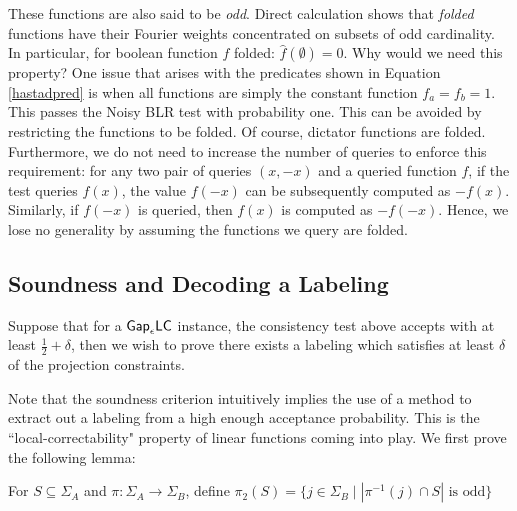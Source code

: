 These functions are also said to be \emph{odd}. Direct calculation shows that \emph{folded} functions have their Fourier weights concentrated on subsets of odd cardinality. In particular, for boolean function $f$ folded: $\widehat{f}(\emptyset) = 0$. Why would we need this property?
%
One issue that arises with the predicates shown in Equation \ref{hastadpred} is when all functions are simply the constant function $f_a = f_b = 1$. This passes the Noisy BLR test with probability one. This can be avoided by restricting the functions to be folded. Of course, dictator functions are folded.
%
Furthermore, we do not need to increase the number of queries to enforce this requirement: for any two pair of queries $(x,-x)$ and a queried function $f$, if the test queries $f(x)$, the value $f(-x)$ can be subsequently computed as $-f(x)$.
%
Similarly, if $f(-x)$ is queried, then $f(x)$ is computed as $-f(-x)$.
%
Hence, we lose no generality by assuming the functions we query are folded.

\subsection{Soundness and Decoding a Labeling}

\begin{proposition}
  Suppose that for a $\mathsf{Gap}_\epsilon\mathsf{LC}$ instance, the consistency test above accepts with at least $\frac{1}{2} + \delta$,  then we wish to prove there exists a labeling which satisfies at least $\delta$ of the projection constraints.
\end{proposition}
%
Note that the soundness criterion intuitively implies the use of a method to extract out a labeling from a high enough acceptance probability. This is the ``local-correctability" property of linear functions coming into play. We first prove the following lemma:

\begin{definition}
  For $S \subseteq \Sigma_A$ and $\pi:\Sigma_A \rightarrow \Sigma_B$, define $\pi_2(S) = \{j \in \Sigma_B \mid |\pi^{-1}(j) \cap S| \text{ is odd}\}$
\end{definition}

